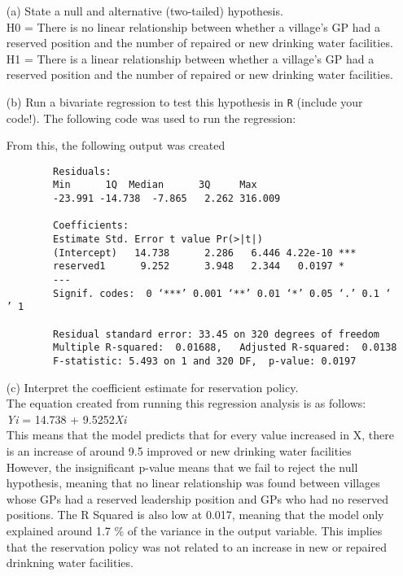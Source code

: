 \documentclass[12pt,letterpaper]{article}
\begin{document}
\newpage
\begin{enumerate}
	\item [(a)] State a null and alternative (two-tailed) hypothesis. \\ 
		\noindent H0 = There is no linear relationship between whether a village's GP had a reserved position and the number of repaired or new drinking water facilities.   \\
		\noindent H1 = There is a linear relationship between whether a village's GP had a reserved position and the number of repaired or new drinking water facilities. 
	\vspace{6cm}
	\item [(b)] Run a bivariate regression to test this hypothesis in \texttt{R} (include your code!).
	\noindent The following code was used to run the regression:
	
	\noindent From this, the following output was created
	\begin{verbatim}
		Residuals:
		Min      1Q  Median      3Q     Max 
		-23.991 -14.738  -7.865   2.262 316.009 
		
		Coefficients:
		Estimate Std. Error t value Pr(>|t|)    
		(Intercept)   14.738      2.286   6.446 4.22e-10 ***
		reserved1      9.252      3.948   2.344   0.0197 *  
		---
		Signif. codes:  0 ‘***’ 0.001 ‘**’ 0.01 ‘*’ 0.05 ‘.’ 0.1 ‘ ’ 1
		
		Residual standard error: 33.45 on 320 degrees of freedom
		Multiple R-squared:  0.01688,	Adjusted R-squared:  0.0138 
		F-statistic: 5.493 on 1 and 320 DF,  p-value: 0.0197
	\end{verbatim}
	

	\vspace{6cm}
	\item [(c)] Interpret the coefficient estimate for reservation policy. \\

	\noindent The equation created from running this regression analysis is as follows: \\
	
	\noindent \textit{Yi} = 14.738 + 9.5252\textit{Xi} \\
	
	\noindent This means that the model predicts that for every value increased in X, there is an increase of around 9.5 improved or new drinking water facilities
	\noindent However, the insignificant p-value means that we fail to reject the null hypothesis, meaning that no linear relationship was found between villages whose GPs had a reserved leadership position and GPs who had no reserved positions. The R Squared is also low at 0.017, meaning that the model only explained around 1.7 \% of the variance in the output variable. This implies that the reservation policy was not related to an increase in new or repaired drinkning water facilities. 
	
\end{enumerate}
\end{document}
